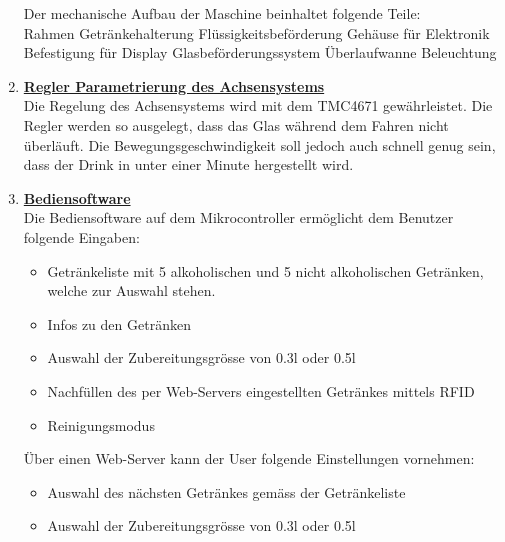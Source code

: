 \begin{enumerate}
Der mechanische Aufbau der Maschine beinhaltet folgende Teile: \\

\textbullet Rahmen \newline
\textbullet Getränkehalterung \newline
\textbullet Flüssigkeitsbeförderung \newline
\textbullet Gehäuse für Elektronik \newline
\textbullet Befestigung für Display \newline
\textbullet Glasbeförderungssystem \newline
\textbullet Überlaufwanne \newline
\textbullet Beleuchtung\\
\newpage

\item \underline{\textbf{Regler Parametrierung des Achsensystems}}\mbox{}\\

Die Regelung des Achsensystems wird mit dem TMC4671 gewährleistet. Die Regler werden so ausgelegt, dass das Glas während dem Fahren nicht überläuft. Die Bewegungsgeschwindigkeit soll jedoch auch schnell genug sein, dass der Drink in unter einer Minute hergestellt wird.\\

\item \underline{\textbf{Bediensoftware}}\mbox{}\\

Die Bediensoftware auf dem Mikrocontroller ermöglicht dem Benutzer folgende Eingaben:\\
\begin{itemize}

\item Getränkeliste mit 5 alkoholischen und 5 nicht alkoholischen Getränken, welche zur Auswahl stehen.
\item Infos zu den Getränken
\item Auswahl der Zubereitungsgrösse von 0.3l oder 0.5l
\item Nachfüllen des per Web-Servers eingestellten Getränkes mittels RFID
\item Reinigungsmodus\\
\end{itemize}

Über einen Web-Server kann der User folgende Einstellungen vornehmen: \\

\begin{itemize}
\item Auswahl des nächsten Getränkes gemäss der Getränkeliste
\item Auswahl der Zubereitungsgrösse von 0.3l oder 0.5l\\ 
\end{itemize} 



\end{enumerate}
